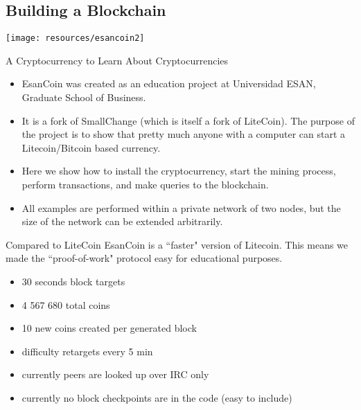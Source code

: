 \begin{darkframes}

\section{Building a Blockchain}%
\begin{frame}
	\begin{center}
	\texttt{[image: resources/esancoin2]}
	\end{center}
\end{frame}	

\begin{frame}{A Cryptocurrency to Learn About Cryptocurrencies}
\begin{itemize}
	\item EsanCoin was created as an education project at Universidad ESAN, Graduate School of Business. 
	\item It is a fork of SmallChange (which is itself a fork of LiteCoin). The purpose of the project is to show that pretty much anyone with a computer can start a Litecoin/Bitcoin based currency. 
	\item Here we show how to install the cryptocurrency, start the mining process, perform transactions, and make queries to the blockchain. 
	\item All examples are performed within a private network of two nodes, but the size of the network can be extended  arbitrarily. 
	\end{itemize}
\end{frame}	

\begin{frame}{Compared to LiteCoin}
EsanCoin is a ``faster" version of Litecoin. This means we made the ``proof-of-work" protocol easy for educational purposes. %
	\begin{itemize}
	\item 30 seconds block targets
	\item 4 567 680 total coins
	\item 10 new coins created per generated block
	\item difficulty retargets every 5 min
	\item currently peers are looked up over IRC only
	\item currently no block checkpoints are in the code (easy to include)
	\end{itemize}
\end{frame}	


\end{darkframes}
